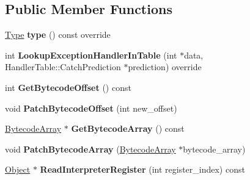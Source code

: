 \subsection*{Public Member Functions}
\begin{DoxyCompactItemize}
\item 
\hyperlink{classv8_1_1internal_1_1_type}{Type} {\bfseries type} () const  override\hypertarget{classv8_1_1internal_1_1_interpreted_frame_a06c63cbf114c61dc969fef7c49b318e4}{}\label{classv8_1_1internal_1_1_interpreted_frame_a06c63cbf114c61dc969fef7c49b318e4}

\item 
int {\bfseries Lookup\+Exception\+Handler\+In\+Table} (int $\ast$data, Handler\+Table\+::\+Catch\+Prediction $\ast$prediction) override\hypertarget{classv8_1_1internal_1_1_interpreted_frame_a9b997e24419fe747402b2c3cf1b4d4be}{}\label{classv8_1_1internal_1_1_interpreted_frame_a9b997e24419fe747402b2c3cf1b4d4be}

\item 
int {\bfseries Get\+Bytecode\+Offset} () const \hypertarget{classv8_1_1internal_1_1_interpreted_frame_a287f8d60e48386ca60d53b3c2a01a69c}{}\label{classv8_1_1internal_1_1_interpreted_frame_a287f8d60e48386ca60d53b3c2a01a69c}

\item 
void {\bfseries Patch\+Bytecode\+Offset} (int new\+\_\+offset)\hypertarget{classv8_1_1internal_1_1_interpreted_frame_a544cdc5b93167c2a47b0acdd240eb923}{}\label{classv8_1_1internal_1_1_interpreted_frame_a544cdc5b93167c2a47b0acdd240eb923}

\item 
\hyperlink{classv8_1_1internal_1_1_bytecode_array}{Bytecode\+Array} $\ast$ {\bfseries Get\+Bytecode\+Array} () const \hypertarget{classv8_1_1internal_1_1_interpreted_frame_ab724a767cd9b68883c0c62439a56a662}{}\label{classv8_1_1internal_1_1_interpreted_frame_ab724a767cd9b68883c0c62439a56a662}

\item 
void {\bfseries Patch\+Bytecode\+Array} (\hyperlink{classv8_1_1internal_1_1_bytecode_array}{Bytecode\+Array} $\ast$bytecode\+\_\+array)\hypertarget{classv8_1_1internal_1_1_interpreted_frame_a3eb7bfc21c3d4ef7efcd1f2bff9390a0}{}\label{classv8_1_1internal_1_1_interpreted_frame_a3eb7bfc21c3d4ef7efcd1f2bff9390a0}

\item 
\hyperlink{classv8_1_1internal_1_1_object}{Object} $\ast$ {\bfseries Read\+Interpreter\+Register} (int register\+\_\+index) const \hypertarget{classv8_1_1internal_1_1_interpreted_frame_a5cbc32453ed340373373414acc50617d}{}\label{classv8_1_1internal_1_1_interpreted_frame_a5cbc32453ed340373373414acc50617d}


\end{DoxyCompactItemize}
